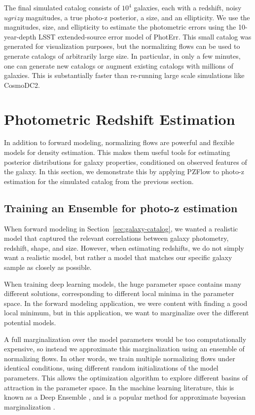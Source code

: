\documentclass[twocolumn,twocolappendix]{aastex631}
\begin{document}
The final simulated catalog consists of $10^4$ galaxies, each with a redshift, noisy $ugrizy$ magnitudes, a true photo-z posterior, a size, and an ellipticity.
We use the magnitudes, size, and ellipticity to estimate the photometric errors using the 10-year-depth LSST extended-source error model of PhotErr.
This small catalog was generated for visualization purposes, but the normalizing flows can be used to generate catalogs of arbitrarily large size.
In particular, in only a few minutes, one can generate new catalogs or augment existing catalogs with millions of galaxies.
This is substantially faster than re-running large scale simulations like CosmoDC2.


\section{Photometric Redshift Estimation}
\label{sec:photo-z}

In addition to forward modeling, normalizing flows are powerful and flexible models for density estimation.
This makes them useful tools for estimating posterior distributions for galaxy properties, conditioned on observed features of the galaxy.
In this section, we demonstrate this by applying PZFlow to photo-z estimation for the simulated catalog from the previous section.

\subsection{Training an Ensemble for photo-z estimation}

When forward modeling in Section~\ref{sec:galaxy-catalog}, we wanted a realistic model that captured the relevant correlations between galaxy photometry, redshift, shape, and size.
However, when estimating redshifts, we do not simply want a realistic model, but rather a model that matches our specific galaxy sample as closely as possible.

When training deep learning models, the huge parameter space contains many different solutions, corresponding to different local minima in the parameter space.
In the forward modeling application, we were content with finding a good local minimum, but in this application, we want to marginalize over the different potential models.

A full marginalization over the model parameters would be too computationally expensive, so instead we approximate this marginalization using an ensemble of normalizing flows.
In other words, we train multiple normalizing flows under identical conditions, using different random initializations of the model parameters.
This allows the optimization algorithm to explore different basins of attraction in the parameter space.
In the machine learning literature, this is known as a Deep Ensemble \citep{lakshminarayanan2017}, and is a popular method for approximate bayesian marginalization \citep{wilson2020,fort2020}.
\end{document}
